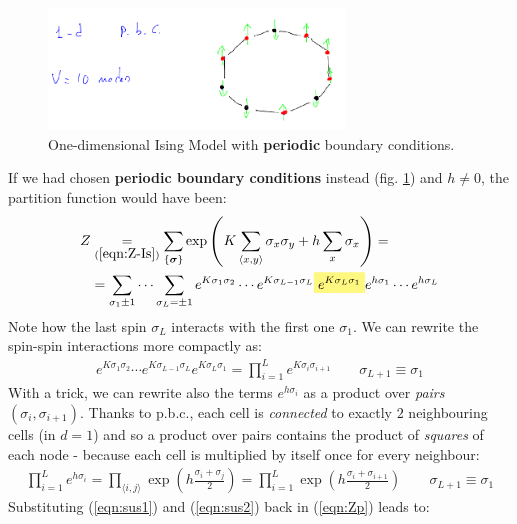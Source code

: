 \documentclass[../template.tex]{subfiles}
\begin{document}
\begin{figure}[H]
    \centering
    \includegraphics[width=0.7\textwidth]{image017.png}
    \caption{One-dimensional Ising Model with \textbf{periodic} boundary conditions.\label{fig:pbcd1}}
\end{figure}

If we had chosen \textbf{periodic boundary conditions} instead (fig. \ref{fig:pbcd1}) and $h\neq 0$, the partition function would have been:
\begin{align}\label{eqn:Zp}
    Z &\underset{(\ref{eqn:Z-Is})}{=}  \sum_{\{\bm{\sigma}\}} \exp\left(K \sum_{\langle x,y \rangle} \sigma_x \sigma_y + h \sum_x \sigma_x\right)  =\\
    &= \sum_{\sigma_1 \pm 1} \cdots \sum_{\sigma_L = \pm 1} e^{K \sigma_1 \sigma_2} \cdots e^{K \sigma_{L-1} \sigma_L} \hlc{Yellow}{e^{K \sigma_{L} \sigma_{1}} }e^{h \sigma_1} \cdots e^{h \sigma_L}
\end{align} 
Note how the last spin $\sigma_L$ interacts with the first one $\sigma_1$. We can rewrite the spin-spin interactions more compactly as:
\begin{align}\label{eqn:sus1}
    e^{K \sigma_1 \sigma_2} \cdots e^{K \sigma_{L-1} \sigma_L} e^{K \sigma_{L} \sigma_{1}} = \prod_{i=1}^L e^{K \sigma_i \sigma_{i+1}} \qquad \sigma_{L+1} \equiv \sigma_1
\end{align}
With a trick, we can rewrite also the terms $e^{h \sigma_i}$ as a product over \textit{pairs} $(\sigma_i, \sigma_{i+1})$. Thanks to p.b.c., each cell is \textit{connected} to exactly $2$ neighbouring cells (in $d=1$) and so a product over pairs contains the product of \textit{squares} of each node - because each cell is multiplied by itself once for every neighbour: 
\begin{align}\label{eqn:sus2}
    \prod_{i=1}^L e^{h \sigma_i} = \prod_{\langle i, j \rangle} \exp\left(h \frac{\sigma_i + \sigma_j}{2} \right) = \prod_{i=1}^L \exp\left(h \frac{\sigma_i + \sigma_{i+1}}{2} \right) \qquad \sigma_{L+1} \equiv \sigma_1
\end{align}
Substituting (\ref{eqn:sus1}) and (\ref{eqn:sus2}) back in (\ref{eqn:Zp}) leads to:
\end{document}
